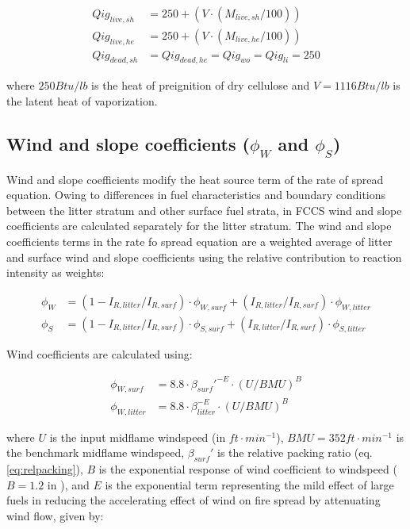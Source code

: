 \documentclass[]{book}
\begin{document}
\begin{eqnarray}
Qig_{live, sh} &= 250 + (V\cdot (M_{live, sh}/100))\\
Qig_{live, he} &= 250 + (V\cdot (M_{live, he}/100))\\
Qig_{dead, sh} &= Qig_{dead, he} = Qig_{wo} = Qig_{li} = 250
\end{eqnarray}

where \(250 Btu/lb\) is the heat of preignition of dry cellulose and
\(V = 1116 Btu/lb\) is the latent heat of vaporization.
\subsection{Wind and slope coefficients ($\phi_W$ and $\phi_S$)} Wind
and slope coefficients modify the heat source term of the rate of spread
equation. Owing to differences in fuel characteristics and boundary
conditions between the litter stratum and other surface fuel strata, in
FCCS wind and slope coefficients are calculated separately for the
litter stratum. The wind and slope coefficients terms in the rate fo
spread equation are a weighted average of litter and surface wind and
slope coefficients using the relative contribution to reaction intensity
as weights:

\begin{eqnarray}
\phi_W &= (1 - I_{R, litter}/I_{R, surf})\cdot \phi_{W, surf} + (I_{R, litter}/I_{R, surf})\cdot \phi_{W, litter}\\
\phi_S &= (1 - I_{R, litter}/I_{R, surf})\cdot \phi_{S, surf} + (I_{R, litter}/I_{R, surf})\cdot \phi_{S, litter}
\end{eqnarray}

Wind coefficients are calculated using:

\begin{eqnarray}
\phi_{W, surf} &= 8.8 \cdot \beta_{surf}'^{-E}\cdot (U/BMU)^B\\
\phi_{W, litter} &= 8.8 \cdot \beta_{litter}^{-E}\cdot (U/BMU)^B
\end{eqnarray}

where \(U\) is the input midflame windspeed (in \(ft\cdot min^{-1}\)),
\(BMU=352 ft\cdot min^{-1}\) is the benchmark midflame windspeed,
\(\beta_{surf}'\) is the relative packing ratio (eq.
\ref{eq:relpacking}), \(B\) is the exponential response of wind
coefficient to windspeed (\(B=1.2\) in \citet{Sandberg2007}), and \(E\)
is the exponential term representing the mild effect of large fuels in
reducing the accelerating effect of wind on fire spread by attenuating
wind flow, given by:
\end{document}
